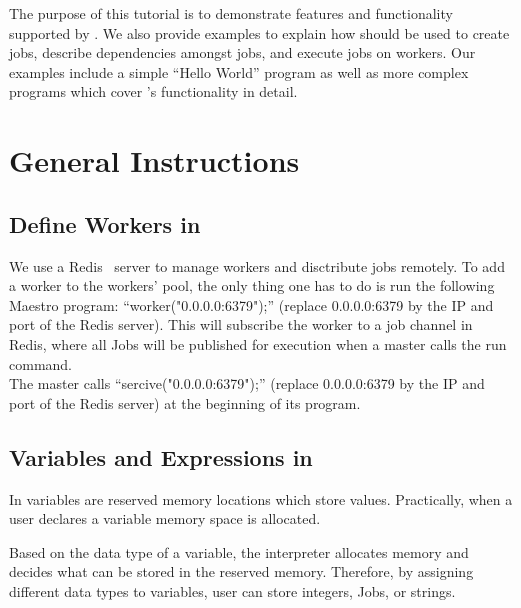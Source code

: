 
The purpose of this tutorial is to demonstrate features and functionality supported by \lang{}.
We also provide examples to explain how \lang{} should be used to create jobs, describe dependencies amongst jobs, and execute jobs on workers.
Our examples include a simple ``Hello World'' program as well as more complex programs which cover \lang{}'s functionality in detail.


\section{General Instructions}
\label{sect:general}

\subsection*{Define Workers in \lang{}}
We use a Redis~\cite{redis} server to manage workers and disctribute jobs remotely.
To add a worker to the workers' pool, the only thing one has to do is run the following Maestro program: ``worker("0.0.0.0:6379");'' (replace 0.0.0.0:6379 by the IP and port of the Redis server).
This will subscribe the worker to a job channel in Redis, where all Jobs will be published for execution when a master calls the run command.\\
The master calls ``sercive("0.0.0.0:6379");'' (replace 0.0.0.0:6379 by the IP and port of the Redis server) at the beginning of its program.

\subsection*{Variables and Expressions in \lang{}}
In \lang{} variables are reserved memory locations which store values.
Practically, when a user declares a variable memory space is allocated.

Based on the data type of a variable, the interpreter allocates memory
and decides what can be stored in the reserved memory. Therefore, by
assigning different data types to variables, user can store integers, Jobs,
or strings.

